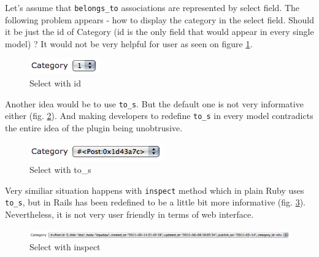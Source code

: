       Let's assume that \texttt{belongs\_to} associations are represented by select field. The following problem appears - 
      how to display the category in the select field. Should it be just the id of Category (id is the only field
      that would appear in every single model) ? It would not be very helpful for user as seen on figure \ref{config01}. 
      
      \begin{figure}[hbt!]
    		\begin{center}
    			\includegraphics{images/chapter05/config01.png}
    			\caption{Select with id}
    			\label{config01}
    		\end{center}
    	\end{figure}
    	
      Another idea would be to use \texttt{to\_s}. But the default one is not very informative either (fig. \ref{config02}). And
      making developers to redefine \texttt{to\_s} in every model contradicts the entire idea of the plugin being 
      unobtrusive. 
      
      \begin{figure}[hbt!]
    		\begin{center}
    			\includegraphics{images/chapter05/config02.png}
    			\caption{Select with to\_s}
    			\label{config02}
    		\end{center}
    	\end{figure}
    	
    	Very similiar situation happens with \texttt{inspect} method which in plain Ruby uses \texttt{to\_s}, but in
    	Rails has been redefined to be a little bit more informative (fig. \ref{config03}). Nevertheless,
      it is not very user friendly in terms of web interface. 
    	
    	\begin{figure}[hbt!]
    		\begin{center}
    			\includegraphics[width=\linewidth]{images/chapter05/config03.png}
    			\caption{Select with inspect}
    			\label{config03}
    		\end{center}
    	\end{figure}
    	
